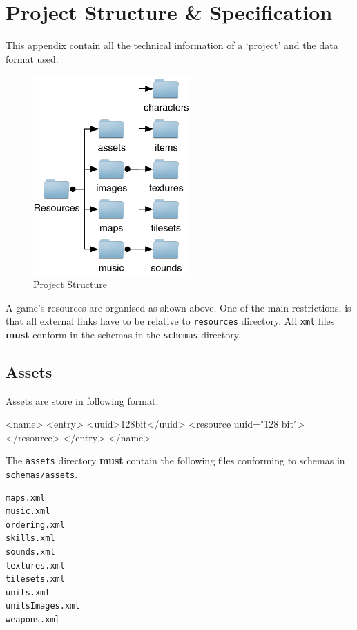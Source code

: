 \section{Project Structure \& Specification}
\label{sec:project_structure___specification}

This appendix contain all the technical information of a `project' and the data format used.

\begin{figure}[htbp]
	\centering
		\includegraphics[height=3in]{figures/Files.pdf}
	\caption{Project Structure}
	\label{fig:figures_Files}
\end{figure}

A game's resources  are organised as shown above. One of the main restrictions, is that all external links have to be relative to \texttt{resources} directory. All \texttt{xml} files \textbf{must} conform in the schemas in the \texttt{schemas} directory. 


\subsection{Assets}
Assets are store in following format:
\begin{lst:resource}[caption=Assets format]
<name>
  <entry>
    <uuid>128bit</uuid> 
    <resource uuid="128 bit">
    </resource>
  </entry>
</name>
\end{lst:resource}

The \texttt{assets} directory \textbf{must} contain the following files conforming to schemas in \texttt{schemas/assets}.
\begin{lstlisting}[caption=Required Assets]
maps.xml
music.xml
ordering.xml
skills.xml
sounds.xml
textures.xml
tilesets.xml
units.xml
unitsImages.xml
weapons.xml
\end{lstlisting}

